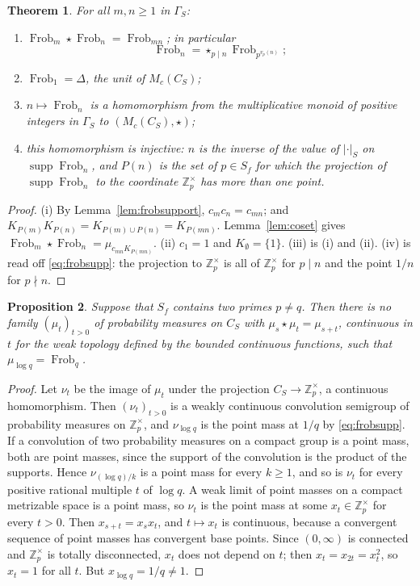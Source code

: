 \documentclass[11pt]{amsart}
\newtheorem{theorem}{Theorem}[section]
\newtheorem{proposition}[theorem]{Proposition}
\theoremstyle{definition}
\newcommand{\Z}{\mathbb Z}
\newcommand{\Frob}{\operatorname{Frob}}
\newcommand{\supp}{\operatorname{supp}}
\begin{document}
\begin{theorem}\label{thm:frobmonoidal}
For all $m,n\ge1$ in $\Gamma_S$:
\begin{enumerate}
\item[(i)] $\Frob_m\star\Frob_n=\Frob_{mn}$; in particular
\begin{equation}\label{eq:frob}
  \Frob_n=\mathop{\star}_{p\mid n}\Frob_{p^{v_p(n)}} ;
\end{equation}
\item[(ii)] $\Frob_1=\Delta$, the unit of $M_c(C_S)$;
\item[(iii)] $n\mapsto\Frob_n$ is a homomorphism from the multiplicative
monoid of positive integers in $\Gamma_S$ to $(M_c(C_S),\star)$;
\item[(iv)] this homomorphism is injective: $n$ is the inverse of the value
of $|\cdot|_S$ on $\supp\Frob_n$, and $P(n)$ is the set of $p\in S_f$ for
which the projection of $\supp\Frob_n$ to the coordinate $\Z_p^\times$ has
more than one point.
\end{enumerate}
\end{theorem}

\begin{proof}
(i) By Lemma~\ref{lem:frobsupport}, $c_mc_n=c_{mn}$; and
$K_{P(m)}K_{P(n)}=K_{P(m)\cup P(n)}=K_{P(mn)}$. Lemma~\ref{lem:coset} gives
$\Frob_m\star\Frob_n=\mu_{c_{mn}K_{P(mn)}}$. (ii) $c_1=1$ and
$K_\emptyset=\{1\}$. (iii) is (i) and (ii). (iv) is read off
\eqref{eq:frobsupp}: the projection to $\Z_p^\times$ is all of $\Z_p^\times$
for $p\mid n$ and the point $1/n$ for $p\nmid n$.
\end{proof}

\begin{proposition}\label{rem:nointerp}
Suppose that $S_f$ contains two primes $p\ne q$. Then there is no family
$(\mu_t)_{t>0}$ of probability measures on $C_S$ with
$\mu_s\star\mu_t=\mu_{s+t}$, continuous in $t$ for the weak topology defined
by the bounded continuous functions, such that $\mu_{\log q}=\Frob_q$.
\end{proposition}

\begin{proof}
Let $\nu_t$ be the image of $\mu_t$ under the projection
$C_S\to\Z_p^\times$, a continuous homomorphism. Then $(\nu_t)_{t>0}$ is a
weakly continuous convolution semigroup of probability measures on
$\Z_p^\times$, and $\nu_{\log q}$ is the point mass at $1/q$ by
\eqref{eq:frobsupp}. If a convolution of two probability measures on a
compact group is a point mass, both are point masses, since the support of
the convolution is the product of the supports. Hence $\nu_{(\log q)/k}$ is a
point mass for every $k\ge1$, and so is $\nu_t$ for every positive rational
multiple $t$ of $\log q$. A weak limit of point masses on a compact
metrizable space is a point mass, so $\nu_t$ is the point mass at some
$x_t\in\Z_p^\times$ for every $t>0$. Then $x_{s+t}=x_sx_t$, and $t\mapsto x_t$
is continuous, because a convergent sequence of point masses has convergent
base points. Since $(0,\infty)$ is connected and $\Z_p^\times$ is totally
disconnected, $x_t$ does not depend on $t$; then $x_t=x_{2t}=x_t^2$, so
$x_t=1$ for all $t$. But $x_{\log q}=1/q\ne1$.
\end{proof}
\end{document}
